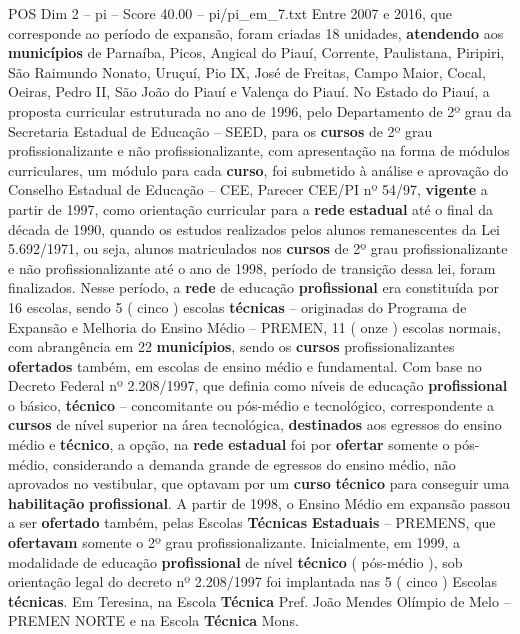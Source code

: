 \begin{textsample}{POS Dim 2 – pi – Score 40.00 – pi/pi\_em\_7.txt}
Entre 2007 e 2016, que corresponde ao período de expansão, foram criadas 18 unidades, \textbf{atendendo} aos \textbf{municípios} de Parnaíba, Picos, Angical do Piauí, Corrente, Paulistana, Piripiri, São Raimundo Nonato, Uruçuí, Pio IX, José de Freitas, Campo Maior, Cocal, Oeiras, Pedro II, São João do Piauí e Valença do Piauí.
No Estado do Piauí, a proposta curricular estruturada no ano de 1996, pelo Departamento de 2º grau da Secretaria Estadual de Educação – SEED, para os \textbf{cursos} de 2º grau profissionalizante e não profissionalizante, com apresentação na forma de módulos curriculares, um módulo para cada \textbf{curso}, foi submetido à análise e aprovação do Conselho Estadual de Educação – CEE, Parecer CEE/PI nº 54/97, \textbf{vigente} a partir de 1997, como orientação curricular para a \textbf{rede} \textbf{estadual} até o final da década de 1990, quando os estudos realizados pelos alunos remanescentes da Lei 5.692/1971, ou seja, alunos matriculados nos \textbf{cursos} de 2º grau profissionalizante e não profissionalizante até o ano de 1998, período de transição dessa lei, foram finalizados.
Nesse período, a \textbf{rede} de educação \textbf{profissional} era constituída por 16 escolas, sendo 5 ( cinco ) escolas \textbf{técnicas} – originadas do Programa de Expansão e Melhoria do Ensino Médio – PREMEN, 11 ( onze ) escolas normais, com abrangência em 22 \textbf{municípios}, sendo os \textbf{cursos} profissionalizantes \textbf{ofertados} também, em escolas de ensino médio e fundamental.
Com base no Decreto Federal nº 2.208/1997, que definia como níveis de educação \textbf{profissional} o básico, \textbf{técnico} – concomitante ou pós-médio e tecnológico, correspondente a \textbf{cursos} de nível superior na área tecnológica, \textbf{destinados} aos egressos do ensino médio e \textbf{técnico}, a opção, na \textbf{rede} \textbf{estadual} foi por \textbf{ofertar} somente o pós-médio, considerando a demanda grande de egressos do ensino médio, não aprovados no vestibular, que optavam por um \textbf{curso} \textbf{técnico} para conseguir uma \textbf{habilitação} \textbf{profissional}.
A partir de 1998, o Ensino Médio em expansão passou a ser \textbf{ofertado} também, pelas Escolas \textbf{Técnicas} \textbf{Estaduais} – PREMENS, que \textbf{ofertavam} somente o 2º grau profissionalizante.
Inicialmente, em 1999, a modalidade de educação \textbf{profissional} de nível \textbf{técnico} ( pós-médio ), sob orientação legal do decreto nº 2.208/1997 foi implantada nas 5 ( cinco ) Escolas \textbf{técnicas}.
Em Teresina, na Escola \textbf{Técnica} Pref.
João Mendes Olímpio de Melo – PREMEN NORTE e na Escola \textbf{Técnica} Mons.

\end{textsample}
